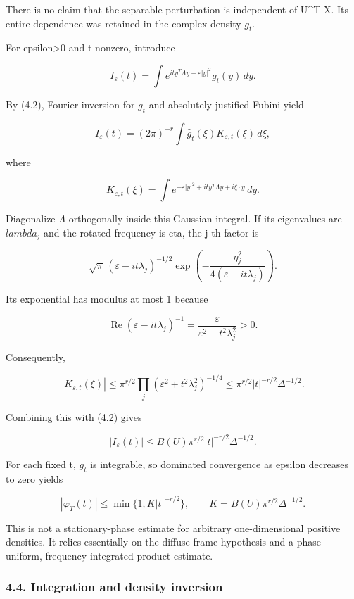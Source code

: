 \documentclass[
  11pt,
]{article}
\begin{document}
There is no claim that the separable perturbation is independent of
U\^{}T X. Its entire dependence was retained in the complex density
\(g_t\).

For epsilon\textgreater0 and t nonzero, introduce

\[
I_\varepsilon(t)=\int e^{it y^T\Lambda y-\varepsilon|y|^2}g_t(y)\,dy.
\]

By (4.2), Fourier inversion for \(g_t\) and absolutely justified Fubini
yield

\[
I_\varepsilon(t)=(2\pi)^{-r}\int\widehat g_t(\xi)K_{\varepsilon,t}(\xi)\,d\xi,
\]

where

\[
K_{\varepsilon,t}(\xi)=\int e^{-\varepsilon|y|^2+it y^T\Lambda y+i\xi\cdot y}\,dy.
\]

Diagonalize \(\Lambda\) orthogonally inside this Gaussian integral. If
its eigenvalues are \(lambda_j\) and the rotated frequency is eta, the
j-th factor is

\[
\sqrt\pi\,(\varepsilon-it\lambda_j)^{-1/2}
\exp\!\left(-\frac{\eta_j^2}{4(\varepsilon-it\lambda_j)}\right).
\]

Its exponential has modulus at most 1 because

\[
\operatorname{Re}(\varepsilon-it\lambda_j)^{-1}
=\frac{\varepsilon}{\varepsilon^2+t^2\lambda_j^2}>0.
\]

Consequently,

\[
|K_{\varepsilon,t}(\xi)|
\le\pi^{r/2}\prod_j(\varepsilon^2+t^2\lambda_j^2)^{-1/4}
\le\pi^{r/2}|t|^{-r/2}\Delta^{-1/2}.
\]

Combining this with (4.2) gives

\[
|I_\varepsilon(t)|\le B(U)\pi^{r/2}|t|^{-r/2}\Delta^{-1/2}.
\]

For each fixed t, \(g_t\) is integrable, so dominated convergence as
epsilon decreases to zero yields

\[
|\varphi_T(t)|\le\min\{1,K|t|^{-r/2}\},
\qquad K=B(U)\pi^{r/2}\Delta^{-1/2}.
\tag{4.4}
\]

This is not a stationary-phase estimate for arbitrary one-dimensional
positive densities. It relies essentially on the diffuse-frame
hypothesis and a phase-uniform, frequency-integrated product estimate.

\subsubsection{4.4. Integration and density
inversion}\label{integration-and-density-inversion}
\end{document}
